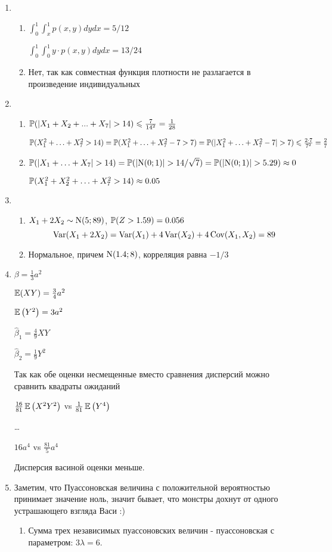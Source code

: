 \begin{enumerate}
\item
\begin{enumerate}
\item $\int_{0}^{1}\int_{x}^{1}p(x,y)dydx = 5/12$

$\int_{0}^{1}\int_{0}^{1}y\cdot p(x,y)dydx = 13/24$
\item Нет, так как совместная функция плотности не разлагается в произведение
индивидуальных
\end{enumerate}
\item
\begin{enumerate}
\item $\P(|X_{1}+X_{2}+...+X_{7}|>14)\leq \frac{7}{14^2}=\frac{1}{28}$

$\P(X_{1}^{2} + \ldots + X_{7}^{2} > 14) = \P(X_{1}^{2} + \ldots + X_{7}^{2} - 7 > 7)
= \P(|X_{1}^{2} + \ldots + X_{7}^{2} - 7| > 7) \leq \frac{2 \cdot 7}{7^2} = \frac{2}{7}$
\item $\P(|X_{1} + \ldots + X_{7}| > 14) = \P(|\cN(0;1)| > 14/\sqrt{7}) = \P(|\cN(0;1)| > 5.29) \approx 0$

$\P(X_{1}^{2} + X_{2}^{2} + \ldots + X_{7}^{2} > 14) \approx 0.05$
\end{enumerate}
\item
\begin{enumerate}
\item $X_{1} + 2X_{2} \sim \cN(5;89)$, $\P(Z > 1.59) = 0.056$
\[
\Var(X_1 + 2X_2) = \Var(X_1) + 4\Var(X_2) + 4\Cov(X_1, X_2) = 89
\]
\item Нормальное, причем $\cN(1.4;8)$, корреляция равна $-1/3$
\end{enumerate}
\item $\beta = \frac{1}{3}a^{2}$

$\E(XY) = \frac{3}{4}a^{2}$

$\E\left(Y^{2}\right) = 3a^{2}$

$\hat{\beta}_{1} = \frac{4}{9}XY$

$\hat{\beta}_{2} = \frac{1}{9}Y^{2}$

Так как обе оценки несмещенные вместо сравнения дисперсий можно сравнить квадраты
ожиданий

$\frac{16}{81}\E\left(X^{2}Y^{2}\right)$ vs $\frac{1}{81}\E\left(Y^{4}\right)$

\ldots

$16 a^4$ vs $\frac{81}{5} a^{4}$

Дисперсия васиной оценки меньше.
\item Заметим, что Пуассоновская величина с положительной вероятностью принимает
значение ноль, значит бывает, что монстры дохнут от одного устрашающего взгляда Васи :)
\begin{enumerate}
\item Сумма трех независимых пуассоновских величин - пуассоновская с параметром: $3\lambda=6$.


\end{enumerate}
\end{enumerate}

